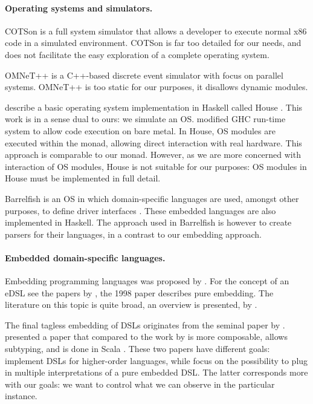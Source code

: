 \paragraph{Operating systems and simulators.}
COTSon \cite{cotson} is a full system simulator that allows a developer to execute normal x86 code in a simulated environment.
COTSon is far too detailed for our needs, and does not facilitate the easy exploration of a complete operating system.

OMNeT++ \cite{omnet} is a C++-based discrete event simulator with focus on parallel systems. OMNeT++ is too static for our purposes, it disallows dynamic modules.

\citeauthor{house} describe a basic operating system implementation in Haskell called House \cite{house}.
This work is in a sense dual to ours: we simulate an OS.
\citeauthor{house} modified GHC run-time system to allow code execution on bare metal.
In House, OS modules are executed within the  monad, allowing direct interaction with real hardware.
This approach is comparable to our  monad.
However, as we are more concerned with interaction of OS modules, House is not suitable for our purposes:  OS modules in House must be implemented in full detail.

Barrelfish \cite{Baumann:2009:MNO:1629575.1629579} is an OS in which domain-specific languages are used, amongst other purposes, to define driver interfaces \cite{barrelfish}.
These embedded languages are also implemented in Haskell.
The approach used in Barrelfish is however to create parsers for their languages, in a contrast to our embedding approach.


\paragraph{Embedded domain-specific languages.}
Embedding programming languages was proposed by \citeauthor{Landin:1966:NPL:365230.365257} \cite{Landin:1966:NPL:365230.365257}.
For the concept of an eDSL see the papers by \citeauthor{hudak1} \cite{hudak1,hudak2}, the 1998 paper describes pure embedding.
The literature on this topic is quite broad, an overview is presented, \eg by \citeauthor{dsl-survey} \cite{dsl-survey}.

The final tagless embedding of DSLs originates from the seminal paper by \citeauthor{final_tagless_embedding} \cite{final_tagless_embedding}.
\citeauthor{Hofer:2008:PED:1449913.1449935} \cite{Hofer:2008:PED:1449913.1449935} presented a paper that compared to the work by \citeauthor{final_tagless_embedding} \cite{final_tagless_embedding} is more composable, allows subtyping, and is done in Scala \cite{odersky2008programming}.
These two papers have different goals: \citeauthor{final_tagless_embedding} implement DSLs for higher-order languages, while \citeauthor{Hofer:2008:PED:1449913.1449935} focus on the possibility to plug in multiple interpretations of a pure embedded DSL.
The latter corresponds more with our goals: we want to control  what we can observe in the particular instance.

